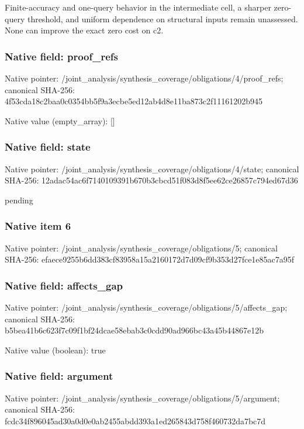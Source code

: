 \documentclass[10pt,a4paper]{article}
\begin{document}
\begingroup\raggedright\sloppy Finite-accuracy and one-query behavior in the intermediate cell,\allowbreak{} a sharper zero-query threshold,\allowbreak{} and uniform dependence on structural inputs remain unassessed. None can improve the exact zero cost on c2.\par\endgroup

\subsubsection{Native field: proof\_\allowbreak{}refs}
Native pointer: /joint\_\allowbreak{}analysis/synthesis\_\allowbreak{}coverage/obligations/4/proof\_\allowbreak{}refs; canonical SHA-256: 4f53cda18c2baa0c0354bb5f9a3ecbe5ed12ab4d8e11ba873c2f11161202b945

Native value (empty\_\allowbreak{}array): []

\subsubsection{Native field: state}
Native pointer: /joint\_\allowbreak{}analysis/synthesis\_\allowbreak{}coverage/obligations/4/state; canonical SHA-256: 12adac54ac6f7140109391b670b3cbcd51f083d8f5ee62ce26857c794ed67d36

\begingroup\raggedright\sloppy pending\par\endgroup

\subsubsection{Native item 6}
Native pointer: /joint\_\allowbreak{}analysis/synthesis\_\allowbreak{}coverage/obligations/5; canonical SHA-256: efaece9255b6dd383cf83958a15a2160172d7d09cf9b353d27fce1e85ac7a95f

\subsubsection{Native field: affects\_\allowbreak{}gap}
Native pointer: /joint\_\allowbreak{}analysis/synthesis\_\allowbreak{}coverage/obligations/5/affects\_\allowbreak{}gap; canonical SHA-256: b5bea41b6c623f7c09f1bf24dcae58ebab3c0cdd90ad966bc43a45b44867e12b

Native value (boolean): true

\subsubsection{Native field: argument}
Native pointer: /joint\_\allowbreak{}analysis/synthesis\_\allowbreak{}coverage/obligations/5/argument; canonical SHA-256: fcdc34f896045ad30a0d0e0ab2455abdd393a1ed265843d758f460732da7bc7d
\end{document}
